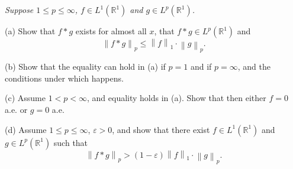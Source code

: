 \begin{problem}\em
Suppose $1\le p\le\infty$, $f\in L^1(\mathbb{R}^1)$ and $g\in L^p(\mathbb{R}^1)$.\par
(a) Show that $f*g$ exists for almost all $x$, that $f*g\in L^p(\mathbb{R}^1)$ and 
$$
\left\| f*g \right\| _p\le \left\| f \right\| _1\cdot \left\| g \right\| _p.
$$\par
(b) Show that the equality can hold in (a) if $p=1$ and if $p=\infty$, and the conditions under which happens.\par
(c) Assume $1<p<\infty$, and equality holds in (a). Show that then either $f=0$ a.e. or $g=0$ a.e.\par
(d) Assume $1\le p\le\infty$, $\varepsilon>0$, and show that there exist $f\in L^1(\mathbb{R}^1)$ and $g\in L^p(\mathbb{R}^1)$ such that 
$$
\left\| f*g \right\| _p>\left( 1-\varepsilon \right) \left\| f \right\| _1\cdot \left\| g \right\| _p.
$$
\end{problem}
